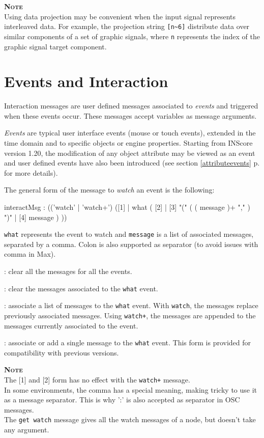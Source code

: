 \documentclass[a4paper,twoside]{report}
\newcommand{\toplevel}[1]	{\chapter{#1}}
\newcommand{\fullref}[1]	{\ref{#1} p.\pageref{#1}}
\newcommand{\OSC}[1]		{\texttt{#1}}
\newcommand{\note}	[1]		{\vspace{2mm}\textbf{\hspace{-0.9cm}\textbf{\textsc{Note #1}}}}
\let\olditemize\itemize
\let\oldenditemize\enditemize
\renewenvironment{itemize} 	{\olditemize \setlength{\itemsep}{1mm}}{\oldenditemize}
\begin{document}
\note{} \\
Using data projection may be convenient when the input signal represents interleaved data. For example, the projection string \OSC{[n\~{}6]} distribute data over similar components of a set of graphic signals, where \OSC{n} represents the index of the graphic signal target component.


\toplevel{Events and Interaction}
\label{interaction}

Interaction messages are user defined messages associated to \textit{events} and triggered when these events occur. These messages accept variables as message arguments.

\textit{Events} are typical user interface events (mouse or touch events), extended in the time domain and to specific objects or engine properties. Starting from INScore version 1.20, the modification of any object attribute may be viewed as an event and user defined events have also been introduced (see section \fullref{attributeevents} for more details). 

The general form of the message to \textit{watch} an event is the following:
\begin{rail}
interactMsg : (('watch' | 'watch+')  ([1] | 
					what  ( [2] 
							| [3] "(" ( ( message  )+ "," ) ")" 
							| [4] message )  )) 
\end{rail}

\OSC{what} represents the event to watch and \OSC{message} is a list of associated messages, separated by a comma. Colon is also supported as separator (to avoid issues with comma in Max).

\begin{itemize}
\item [1]: clear all the messages for all the events.
\item [2]: clear the messages associated to the \OSC{what} event.
\item [3]: associate a list of messages to the \OSC{what} event. With \OSC{watch}, the messages replace previously associated messages. Using \OSC{watch+}, the messages are appended to the messages currently associated to the event.
\item [4]: associate or add a single message to the \OSC{what} event. This form is provided for compatibility with previous versions.
\end{itemize}

\note{} \\
	The [1] and [2] form has no effect with the \OSC{watch+} message. \\
	In some environments, the comma has a special meaning, making tricky to use it as a message separator. This is why ':' is also accepted as separator in OSC messages. \\
	The \OSC{get watch} message gives all the watch messages of a node, but doesn't take any argument.
\end{document}
